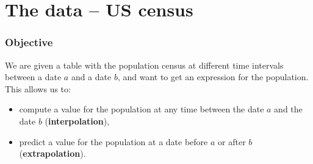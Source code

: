 \documentclass[aspectratio=169]{beamer}
\begin{document}
\section{The data -- US census}



\begin{frame}\frametitle{Objective}
We are given a table with the population census at different time intervals between a date $a$ and a date $b$, and want to get an expression for the population. This allows us to: 
\begin{itemize}
\item compute a value for the population at any time between the date $a$ and the date $b$ (\textbf{interpolation}),
\item predict a value for the population at a date before $a$ or after $b$ (\textbf{extrapolation}).
\end{itemize}
\end{frame}

\end{document}
